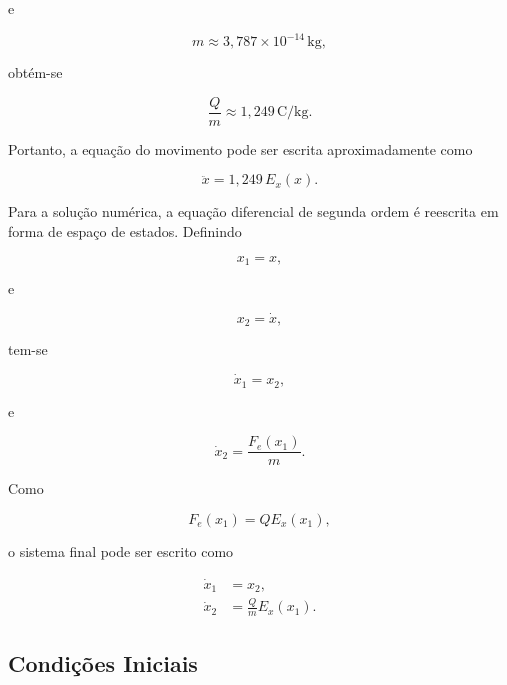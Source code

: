 \documentclass[12pt,a4paper]{article}
\begin{document}
e

\begin{equation}
m
\approx
3{,}787 \times 10^{-14}\,\text{kg},
\end{equation}

obtém-se

\begin{equation}
\frac{Q}{m}
\approx
1{,}249\,\text{C/kg}.
\end{equation}

Portanto, a equação do movimento pode ser escrita aproximadamente como

\begin{equation}
\ddot{x}
=
1{,}249\,E_x(x).
\end{equation}

Para a solução numérica, a equação diferencial de segunda ordem é reescrita em
forma de espaço de estados. Definindo

\begin{equation}
x_1 = x,
\end{equation}

e

\begin{equation}
x_2 = \dot{x},
\end{equation}

tem-se

\begin{equation}
\dot{x}_1
=
x_2,
\end{equation}

e

\begin{equation}
\dot{x}_2
=
\frac{F_e(x_1)}{m}.
\end{equation}

Como

\begin{equation}
F_e(x_1)
=
Q E_x(x_1),
\end{equation}

o sistema final pode ser escrito como

\begin{equation}
\boxed{
\begin{aligned}
\dot{x}_1 &= x_2,\\
\dot{x}_2 &= \frac{Q}{m}E_x(x_1).
\end{aligned}
}
\end{equation}

\subsection{Condições Iniciais}
\end{document}
